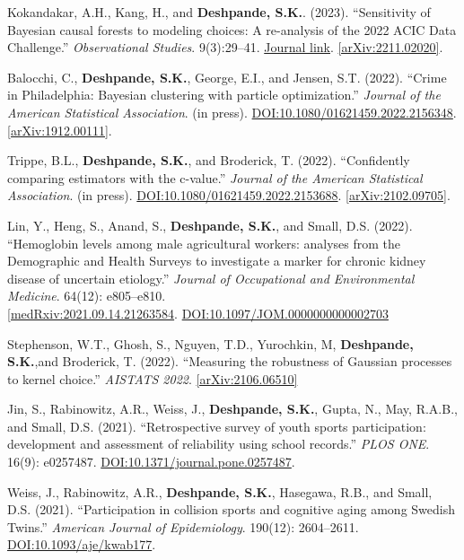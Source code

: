 \documentclass[margin]{res}
\def\skd{\textbf{Deshpande, S.K.}}
\begin{document}
\begin{resume}
Kokandakar, A.H., Kang, H., and \skd. (2023). ``Sensitivity of Bayesian causal forests to modeling choices: A re-analysis of the 2022 ACIC Data Challenge.'' \textit{Observational Studies}. 9(3):29--41. \href{https://muse.jhu.edu/pub/56/article/895651}{Journal link}. \href{https://arxiv.org/abs/2211.02020}{[arXiv:2211.02020]}.

Balocchi, C., \skd, George, E.I., and Jensen, S.T. (2022). ``Crime in Philadelphia: Bayesian clustering with particle optimization.'' \textit{Journal of the American Statistical Association}. (in press).
\href{https://doi.org/10.1080/01621459.2022.2156348}{DOI:10.1080/01621459.2022.2156348}. \href{https://arxiv.org/abs/1912.00111}{[arXiv:1912.00111]}. 

Trippe, B.L., \skd, and Broderick, T. (2022). ``Confidently comparing estimators with the c-value.'' \textit{Journal of the American Statistical Association}. (in press). \href{https://doi.org/10.1080/01621459.2022.2153688}{DOI:10.1080/01621459.2022.2153688}. \href{https://arxiv.org/abs/2102.09705}{[arXiv:2102.09705]}. 

Lin, Y., Heng, S., Anand, S., \skd, and Small, D.S. (2022). ``Hemoglobin levels among male agricultural workers: analyses from the Demographic and Health Surveys to investigate a marker for chronic kidney disease of uncertain etiology.'' \textit{Journal of Occupational and Environmental Medicine}. 64(12): e805--e810. \\ \href{https://www.medrxiv.org/content/10.1101/2021.09.14.21263584v2}{[medRxiv:2021.09.14.21263584}. \href{https://doi.org/10.1097/JOM.0000000000002703}{DOI:10.1097/JOM.0000000000002703}

Stephenson, W.T., Ghosh, S., Nguyen, T.D., Yurochkin, M, \skd,and Broderick, T. (2022). ``Measuring the robustness of Gaussian processes to kernel choice.'' \textit{AISTATS 2022}. \href{https://arxiv.org/abs/2106.06510}{[arXiv:2106.06510]}

Jin, S., Rabinowitz, A.R., Weiss, J., \skd, Gupta, N., May, R.A.B., and Small, D.S. (2021). ``Retrospective survey of youth sports participation: development and assessment of reliability using school records.'' \textit{PLOS ONE}. 16(9): e0257487. \href{https://doi.org/10.1371/journal.pone.0257487}{DOI:10.1371/journal.pone.0257487}.

Weiss, J., Rabinowitz, A.R., \skd, Hasegawa, R.B., and Small, D.S. (2021). ``Participation in collision sports and cognitive aging among Swedish Twins.'' \textit{American Journal of Epidemiology}. 190(12): 2604--2611. \href{https://doi.org/10.1093/aje/kwab177}{DOI:10.1093/aje/kwab177}.


\end{resume}
\end{document}
